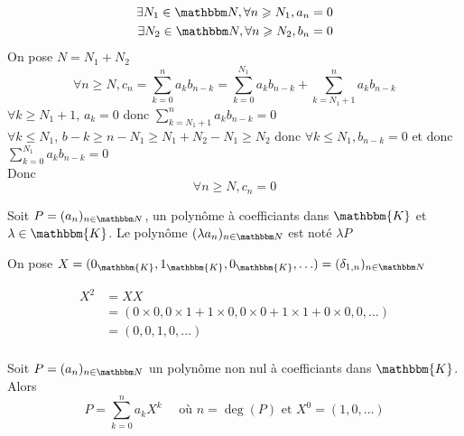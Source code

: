 \begin{prv}
	\begin{align*}
		\exists N_1 \in \N, \forall n \ge N_1, a_n = 0\\
		\exists N_2 \in \N, \forall n \ge N_2, b_n = 0\\
	\end{align*}
	On pose $N = N_1 + N_2$ \[
		\forall n \ge N, c_n = \sum_{k=0}^n a_k b_{n-k} = \sum_{k=0}^{N_1} a_k b_{n-k} + \sum_{k=N_1 + 1}^n a_k b_{n-k}
	\]
	$\forall k \ge N_1 + 1$, $a_k = 0$ donc $\sum_{k=N_1+1}^n a_k b_{n-k} = 0$ \\
	$\forall k \le N_1$, $b-k \ge n - N_1 \ge  N_1 + N_2 - N_1 \ge N_2$ donc $\forall k \le N_1, b_{n-k} = 0$ et donc $\sum_{k=0}^{N_1}a_k b_{n-k} = 0$ \\
	Donc \[
		\forall n \ge N, c_n = 0
	\]
\end{prv}

\begin{rmk}
	[Notation]
	Soit $P = (a_n)_{n\in\N}$, un polynôme à coefficiants dans $\mathbbm{K}$ et $\lambda \in \mathbbm{K}$. Le polynôme $(\lambda a_n)_{n\in\N}$ est noté $\lambda P$
\end{rmk}


\begin{rmk}
	[Notation]
	On pose $X = (0_\mathbbm{K}, 1_\mathbbm{K}, 0_\mathbbm{K}, \ldots) = (\delta_{1,n})_{n\in\N}$
\end{rmk}

\begin{exm}
	\begin{align*}
		X^2 &= X X\\
		&= (0\times 0, 0\times 1 + 1\times 0, 0\times 0 + 1\times 1 + 0\times 0, 0, \ldots) \\
		&= (0, 0, 1, 0, \ldots) \\
	\end{align*}
\end{exm}

\begin{thm}
	Soit $P = (a_n)_{n\in\N}$ un polynôme non nul à coefficiants dans $\mathbbm{K}$. Alors \[
		P = \sum_{k=0}^n a_k X^k \quad \text{ où } n = \deg(P) \text{ et } X^0 = (1,0,\ldots)
	\]
\end{thm}

